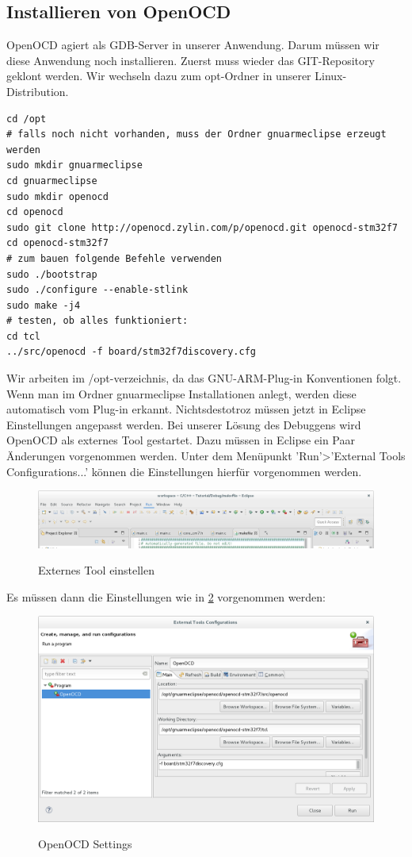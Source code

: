 \documentclass[12pt,a4paper]{article}
\begin{document}
\subsection{Installieren von OpenOCD}
OpenOCD agiert als GDB-Server in unserer Anwendung. Darum müssen wir diese Anwendung noch installieren.
Zuerst muss wieder das GIT-Repository geklont werden. Wir wechseln dazu zum opt-Ordner in unserer Linux-Distribution.
\begin{lstlisting}
cd /opt
# falls noch nicht vorhanden, muss der Ordner gnuarmeclipse erzeugt werden
sudo mkdir gnuarmeclipse
cd gnuarmeclipse
sudo mkdir openocd
cd openocd
sudo git clone http://openocd.zylin.com/p/openocd.git openocd-stm32f7
cd openocd-stm32f7
# zum bauen folgende Befehle verwenden
sudo ./bootstrap
sudo ./configure --enable-stlink
sudo make -j4
# testen, ob alles funktioniert:
cd tcl
../src/openocd -f board/stm32f7discovery.cfg
\end{lstlisting}
Wir arbeiten im /opt-verzeichnis, da das GNU-ARM-Plug-in Konventionen folgt. Wenn man im Ordner gnuarmeclipse Installationen anlegt, werden diese automatisch vom Plug-in erkannt.
Nichtsdestotroz müssen jetzt in Eclipse Einstellungen angepasst werden.
Bei unserer Lösung des Debuggens wird OpenOCD als externes Tool gestartet. Dazu müssen in Eclipse ein Paar Änderungen vorgenommen werden. Unter dem Menüpunkt 'Run'>'External Tools Configurations...' können die Einstellungen hierfür vorgenommen werden.
\begin{figure}[h]
\begin{center}
\includegraphics[width=12cm]{grafiken/debugger/RunConfiguration1.png}
\label{eclipse_external_tool_setup}
\caption{Externes Tool einstellen}
\end{center}
\end{figure}
Es müssen dann die Einstellungen wie in \ref{ecplipse_OpenOCD_setting1} vorgenommen werden: 
\begin{figure}[h]
\begin{center}
\includegraphics[width=12cm]{grafiken/debugger/OpenOCDsetting.png}
\label{ecplipse_OpenOCD_setting1}
\caption{OpenOCD Settings}
\end{center}
\end{figure}
\newpage
\end{document}
